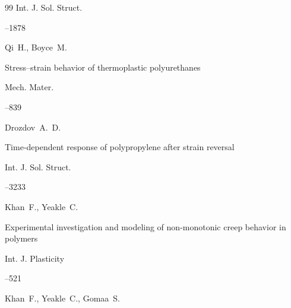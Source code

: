 \begin{thebibliography}{99}
\jour Int. J. Sol. Struct.




--1878







\by Qi~H., Boyce~M.

\paper Stress--strain behavior of thermoplastic polyurethanes

\jour Mech. Mater.




--839







\by Drozdov~A.~D.

\paper Time-dependent response of polypropylene after strain reversal

\jour Int. J. Sol. Struct.




--3233







\by Khan~F., Yeakle~C.

\paper Experimental investigation and modeling of non-monotonic creep behavior in polymers

\jour Int. J. Plasticity




--521







\by Khan~F., Yeakle~C., Gomaa~S.


\end{thebibliography}
